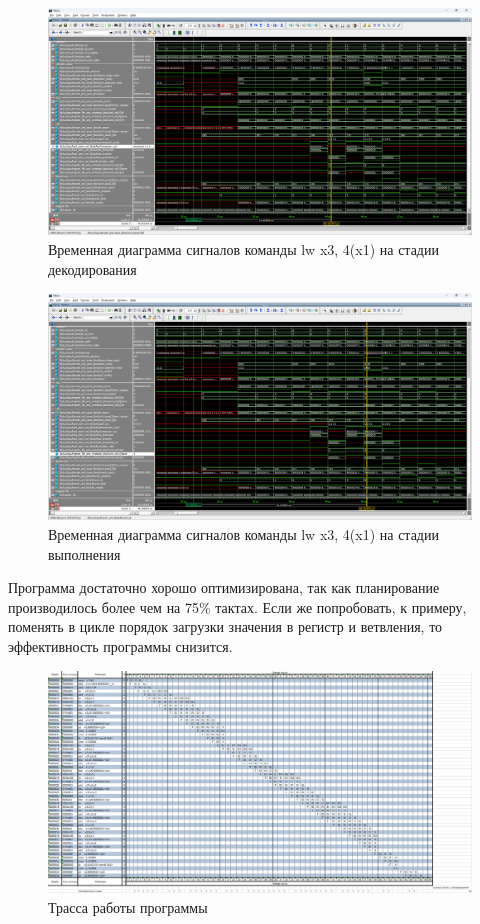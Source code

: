\begin{figure}
    \centering
    \includegraphics[width=1\linewidth]{images/05-decode.png}
    \caption{Временная диаграмма сигналов команды lw x3, 4(x1) на стадии декодирования}
    \label{fig:05-decode}
\end{figure}

\begin{figure}
    \centering
    \includegraphics[width=1\linewidth]{images/05-execute.png}
    \caption{Временная диаграмма сигналов команды lw x3, 4(x1) на стадии выполнения}
    \label{fig:05-execute}
\end{figure}

Программа достаточно хорошо оптимизирована, так как планирование производилось более чем на 75\% тактах. Если же попробовать, к примеру, поменять в цикле порядок загрузки значения в регистр и ветвления, то эффективность программы снизится.

\begin{figure}
    \centering
    \includegraphics[width=1\linewidth]{images/05-route.png}
    \caption{Трасса работы программы}
    \label{fig:05-route}
\end{figure}